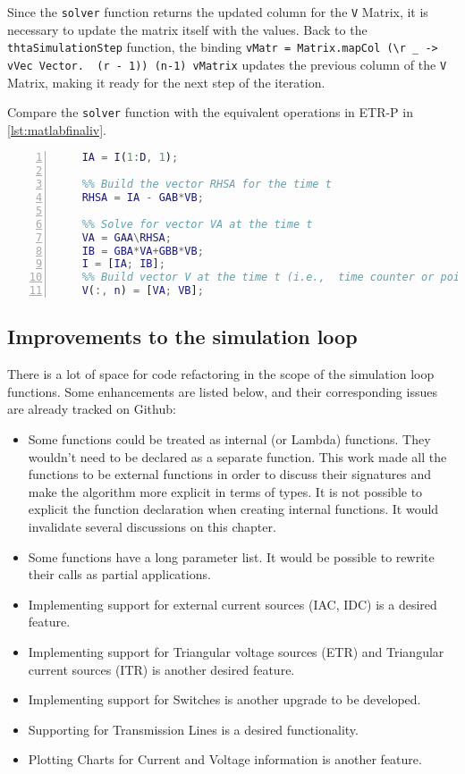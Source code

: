 Since the \lstinline!solver! function returns the updated column for the \lstinline!V! Matrix, it is necessary to update the matrix itself with the values. Back to the \lstinline!thtaSimulationStep! function, the binding \lstinline!vMatr = Matrix.mapCol (\r _ -> vVec Vector.  (r - 1)) (n-1) vMatrix! updates the previous column of the \lstinline!V! Matrix, making it ready for the next step of the iteration.

Compare the \lstinline!solver! function with the equivalent operations in ETR-P in \cref{lst:matlabfinaliv}.

\begin{lstlisting}[language=Matlab, numbers=left, caption={Calculating the final values for I and V in Matlab ETR-P}, captionpos=b, label={lst:matlabfinaliv}]
    %% Build vector IA for the time t
    IA = I(1:D, 1);
    
    %% Build the vector RHSA for the time t
    RHSA = IA - GAB*VB;
    
    %% Solve for vector VA at the time t
    VA = GAA\RHSA;
    IB = GBA*VA+GBB*VB;
    I = [IA; IB];
    %% Build vector V at the time t (i.e.,  time counter or point n)
    V(:, n) = [VA; VB];

\end{lstlisting}

\subsection{ Improvements to the simulation loop }

There is a lot of space for code refactoring in the scope of the simulation loop functions. Some enhancements are listed below, and their corresponding issues are already tracked on Github:

\begin{itemize}
  \item Some functions could be treated as internal (or Lambda) functions. They wouldn't need to be declared as a separate function. This work made all the functions to be external functions in order to discuss their signatures and make the algorithm more explicit in terms of types. It is not possible to explicit the function declaration when creating internal functions. It would invalidate several discussions on this chapter.
  \item Some functions have a long parameter list. It would be possible to rewrite their calls as partial applications.
  \item Implementing support for external current sources (IAC, IDC) is a desired feature.
  \item Implementing support for Triangular voltage sources (ETR) and Triangular current sources (ITR) is another desired feature.
  \item Implementing support for Switches is another upgrade to be developed.
  \item Supporting for Transmission Lines is a desired functionality.
  \item Plotting Charts for Current and Voltage information is another feature.
\end{itemize}

